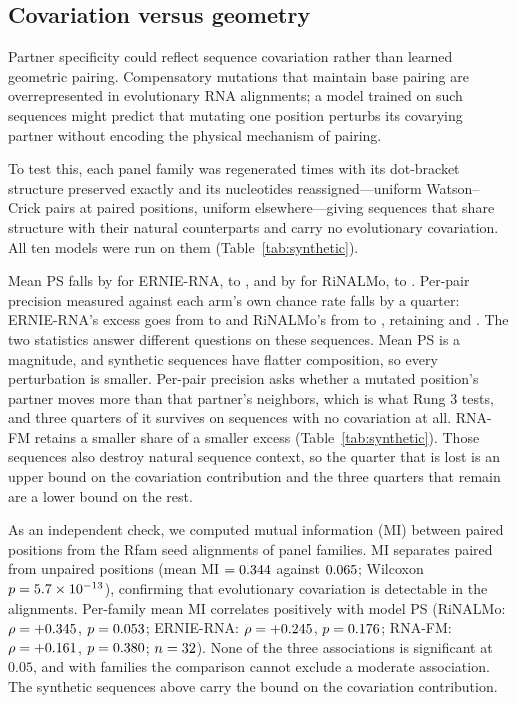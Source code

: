 \documentclass[11pt]{article}
\begin{document}
\subsection{Covariation versus geometry}
\label{sec:covariation-results}

Partner specificity could reflect sequence covariation rather than
learned geometric pairing. Compensatory mutations that maintain base
pairing are overrepresented in evolutionary RNA alignments; a model
trained on such sequences might predict that mutating one position
perturbs its covarying partner without encoding the physical mechanism
of pairing.

To test this, each panel family was regenerated \synPerFamily{} times with its
dot-bracket structure preserved exactly and its nucleotides reassigned---uniform
Watson--Crick pairs at paired positions, uniform elsewhere---giving \synN{}
sequences that share structure with their natural counterparts and carry no
evolutionary covariation. All ten models were run on them
(Table~\ref{tab:synthetic}).



Mean PS falls by \synPSDropErnieRNA{} for ERNIE-RNA, to \synPSErnieRNA{}, and
by \synPSDropRiNALMo{} for RiNALMo, to \synPSRiNALMo{}. Per-pair precision
measured against each arm's own chance rate falls by a quarter: ERNIE-RNA's
excess goes from \natExcessErnieRNA{} to \synExcessErnieRNA{} and RiNALMo's
from \natExcessRiNALMo{} to \synExcessRiNALMo{}, retaining
\synRetainedErnieRNA{} and \synRetainedRiNALMo{}. The two statistics answer
different questions on these sequences. Mean PS is a magnitude, and synthetic
sequences have flatter composition, so every perturbation is smaller. Per-pair
precision asks whether a mutated position's partner moves more than that
partner's neighbors, which is what Rung 3 tests, and three quarters of it
survives on sequences with no covariation at all. RNA-FM retains a smaller
share of a smaller excess (Table~\ref{tab:synthetic}). Those sequences also destroy
natural sequence context, so the quarter that is lost is an upper bound on the
covariation contribution and the three quarters that remain are a lower bound
on the rest.

As an independent check, we computed mutual information (MI) between
paired positions from the Rfam seed alignments of \miFamilies{} panel families.
MI separates paired from unpaired positions (mean MI $= 0.344$ against
$0.065$; Wilcoxon $p = 5.7 \times 10^{-13}$), confirming that evolutionary
covariation is detectable in the alignments. Per-family mean MI correlates
positively with model PS (RiNALMo: $\rho = +0.345$, $p = 0.053$;
ERNIE-RNA: $\rho = +0.245$, $p = 0.176$; RNA-FM:
$\rho = +0.161$, $p = 0.380$; $n = 32$). None of the three
associations is significant at $0.05$, and with \miNRiNALMo{} families the
comparison cannot exclude a moderate association.
The synthetic sequences above carry the bound on the covariation contribution.
\end{document}

